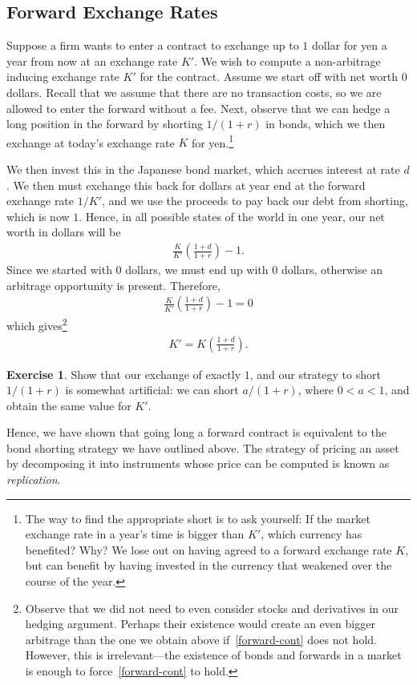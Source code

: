 \documentclass[12pt]{amsbook}
\theoremstyle{plain}
\theoremstyle{definition}
\newtheorem*{exercise}{Exercise}
\theoremstyle{remark}
\numberwithin{equation}{section}  %
\begin{document}
\subsection{Forward Exchange Rates}
Suppose a firm wants to enter a contract to exchange up to $1$
dollar for yen a year from now at an exchange rate $K'$. We
wish to compute a non-arbitrage inducing exchange rate $K'$ for the
contract. 
Assume we start off with net worth $0$ dollars. Recall that we assume that 
there are no transaction costs, so we are allowed to enter the forward without 
a fee. 
Next, observe that we can hedge a long position in the forward by
shorting $1/(1+r)$ in bonds, which we then exchange at today's exchange rate
$K$ for yen.\footnote{The way to find the appropriate short is to ask yourself: 
	If
	the market exchange rate in a year's time is bigger than $K'$,
	which currency has benefited? Why?  We lose out on having agreed to
	a forward exchange rate $K$, but can benefit by having invested in
	the currency that weakened over the course of the year.
}

We then invest this in the Japanese bond market, which accrues interest at rate 
$d$. We then must exchange this back for dollars at year end at the forward 
exchange rate $1/K'$, and we use the proceeds to pay back our debt from 
shorting, which is now $1$. Hence, in all possible states of the world in one 
year, our net worth in dollars will be 
\begin{equation*}
	\begin{split}
		\frac{K}{K'} \left( \frac{1+d}{1+r} \right) -  1.
	\end{split}
\end{equation*}
Since we started with $0$ dollars, we must end up with $0$ dollars, otherwise 
an arbitrage opportunity is present. Therefore,
\begin{equation*}
	\begin{split}
		\frac{K}{K'} \left( \frac{1+d}{1+r} \right) -  1=0
	\end{split}
\end{equation*}
which gives\footnote{Observe that we did not need to even consider stocks
	and derivatives in our hedging argument. Perhaps their existence would
	create an even bigger arbitrage than the one we obtain above 
	if~\eqref{forward-cont} does not hold. However, this is irrelevant---the 
	existence of bonds and forwards in a market is enough to 
	force~\eqref{forward-cont} to hold.
}
\begin{equation}
	\label{forward-cont}
	\begin{split}
		K' = K\left( \frac{1+d}{1+r} \right). 
	\end{split}
\end{equation}
\begin{exercise}
	Show that our exchange of exactly $1$, and our strategy to short $1/(1+r)$ 
	is somewhat artificial: we can short $a/(1+r)$, where $0 < a < 1$, and 
	obtain the same
	value for $K'$.
\end{exercise}
Hence, we have shown that going long a forward contract is equivalent
to the bond shorting strategy we have outlined above. The strategy of pricing 
an asset by decomposing it into instruments whose price can be computed is 
known as \emph{replication}.
\end{document}
